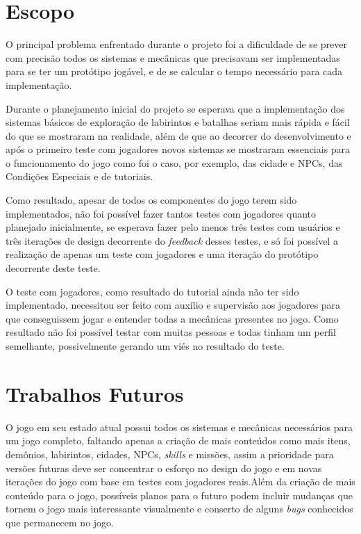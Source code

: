 \documentclass[
	12pt,				%
	openright,			%
	twoside,			%
	a4paper,			%
	english,			%
	french,				%
	spanish,			%
	brazil				%
	]{abntex2}
\begin{document}
\section{Escopo}

	O principal problema enfrentado durante o projeto foi a dificuldade de se prever com precisão todos os sistemas e mecânicas que precisavam ser implementadas para se ter um protótipo jogável, e de se calcular o tempo necessário para cada implementação.
	
	Durante o planejamento inicial do projeto se esperava que a implementação dos sistemas básicos de exploração de labirintos e batalhas seriam mais rápida e fácil do que se mostraram na realidade, além de que ao decorrer do desenvolvimento e após o primeiro teste com jogadores novos sistemas se mostraram essenciais para o funcionamento do jogo como foi o caso, por exemplo, das cidade e NPCs, das Condições Especiais e de tutoriais.
	
	Como resultado, apesar de todos os componentes do jogo terem sido implementados, não foi possível fazer tantos testes com jogadores quanto planejado inicialmente, se esperava fazer pelo menos três testes com usuários e três iterações de design decorrente do \emph{feedback} desses testes, e só foi possível a realização de apenas um teste com jogadores e uma iteração do protótipo decorrente deste teste.

	O teste com jogadores, como resultado do tutorial ainda não ter sido implementado, necessitou ser feito com auxílio e supervisão aos jogadores para que conseguissem jogar e entender todas a mecânicas presentes no jogo. Como resultado não foi possível testar com muitas pessoas e todas tinham um perfil semelhante, possivelmente gerando um viés no resultado do teste.

\section{Trabalhos Futuros}

	O jogo em seu estado atual possui todos os sistemas e mecânicas necessários para um jogo completo, faltando apenas a criação de mais conteúdos como mais itens, demônios, labirintos, cidades, NPCs, \emph{skills} e missões, assim a prioridade para versões futuras deve ser concentrar o esforço no design do jogo e em novas iterações do jogo com base em testes com jogadores reais.Além da criação de mais conteúdo para o jogo, possíveis planos para o futuro podem incluir mudanças que tornem o jogo mais interessante visualmente e conserto de alguns \emph{bugs} conhecidos que permanecem no jogo.
\end{document}

